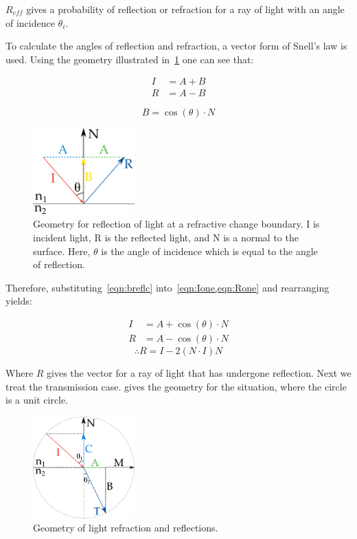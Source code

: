 \begin{appendices}
$R_{eff}$ gives a probability of reflection or refraction for a ray of light with an angle of incidence $\theta_i$.


To calculate the angles of reflection and refraction, a vector form of Snell's law is used.
Using the geometry illustrated in~\cref{fig:reflcfig} one can see that:

\begin{align}
I &= A+B\label{eqn:Ione}\\
R &= A-B\label{eqn:Rone}
\end{align}

\begin{equation}
B=\cos(\theta)\cdot N
\label{eqn:breflc}
\end{equation}

\begin{figure}[!htpb]
    \centering
    \includegraphics[width=0.35\textwidth]{reflc.pdf}
    \caption{Geometry for reflection of light at a refractive change boundary. I is incident light, R is the reflected light, and N is a normal to the surface. Here, $\theta$ is the angle of incidence which is equal to the angle of reflection.}
    \label{fig:reflcfig}
\end{figure}

Therefore, substituting~\cref{eqn:breflc} into~\cref{eqn:Ione,eqn:Rone} and rearranging yields:

\begin{align}
I&=A+\cos\left(\theta\right)\cdot N\\
R&=A-\cos\left(\theta\right)\cdot N
\end{align}
\begin{equation}
\therefore R=I-2(N\cdot I) N\label{eqn:reflcfin}
\end{equation}

Where $R$ gives the vector for a ray of light that has undergone reflection.
Next we treat the transmission case.
 gives the geometry for the situation, where the circle is a unit circle.

\begin{figure}[!htpb]
    \centering
    \includegraphics[width=0.35\textwidth]{trans.pdf}
    \caption{Geometry of light refraction and reflections.}
    \label{fig:transfig}
\end{figure}


\end{appendices}

